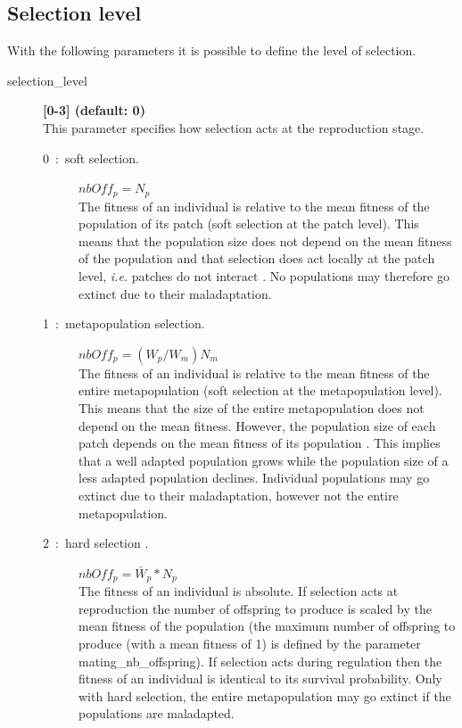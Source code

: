 \documentclass[letterpaper,12pt,oneside]{book}
\begin{document}
\subsection{Selection level}
With the following parameters it is possible to define the level of selection.

\begin{description}
\item[selection\_level] \textbf{[0-3] (default: 0)}\\
This parameter specifies how selection acts at the reproduction stage. 
\begin{description}
\item [0~:~soft selection.] $nbOff_{p} = N_{p}$\\
The fitness of an individual is relative to the mean fitness of the population of its patch (soft selection at the patch level). This means that the population size does not depend on the mean fitness of the population and that selection does act locally at the patch level, \textit{i.e.} patches do not interact \citep{Wallace_1975}. No populations may therefore go extinct due to their maladaptation.

\item [1~:~metapopulation selection.] $nbOff_{p} = (W_{p}/W_{m})N_{m}$\\
The fitness of an individual is relative to the mean fitness of the entire metapopulation (soft selection at the metapopulation level). This means that the size of the entire metapopulation does not depend on the mean fitness. However, the population size of each patch depends on the mean fitness of its population \citep{Ravigne_2004}. This implies that a well adapted population grows while the population size of a less adapted population declines. Individual populations may go extinct due to their maladaptation, however not the entire metapopulation. 

\item [2~:~hard selection .] $nbOff_{p} = \bar{W}_{p}*N_{p}$\\
The fitness of an individual is absolute. If selection acts at reproduction the number of offspring to produce is scaled by the mean fitness of the population (the maximum number of offspring to produce (with a mean fitness of 1) is defined by the parameter \textsf{mating\_nb\_offspring}). If selection acts during regulation then the fitness of an individual is identical to its survival probability. Only with hard selection, the entire metapopulation may go extinct if the populations are maladapted. 



\end{description}
\end{description}
\end{document}
